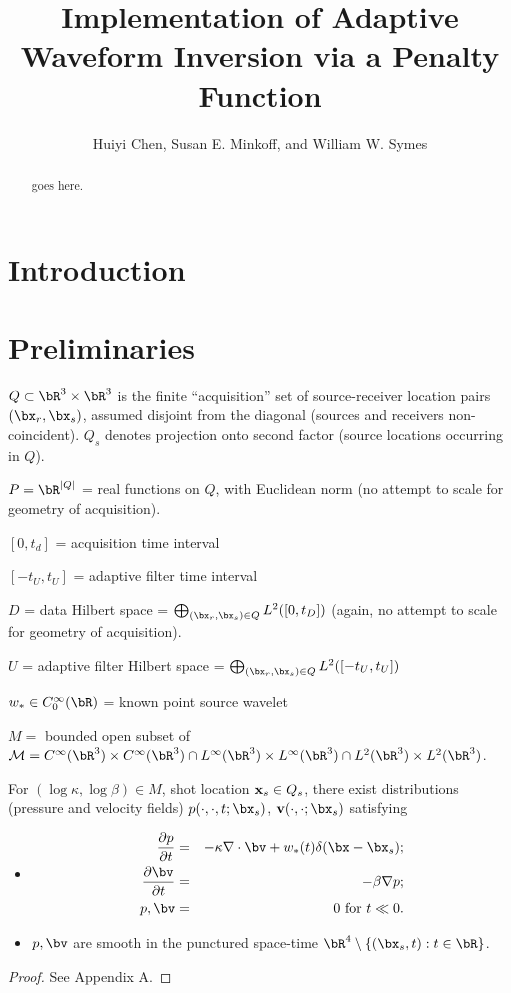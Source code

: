 \title{Implementation of Adaptive Waveform Inversion via a Penalty Function}
\author{Huiyi Chen, Susan E. Minkoff, and William W. Symes}

\begin{abstract}
goes here.
\end{abstract}

\section{Introduction}

\section{Preliminaries}


$Q \subset \bR^3 \times \bR^3$ is the finite ``acquisition'' set of source-receiver location pairs $(\bx_r,\bx_s)$, assumed disjoint from the diagonal (sources and receivers non-coincident). $Q_s$ denotes projection onto second factor (source locations occurring in $Q$).

$P = \bR^{|Q|}$ = real functions on $Q$, with Euclidean norm (no attempt to scale for geometry of acquisition).

$[0,t_d]$ = acquisition time interval

$[-t_U,t_U]$ = adaptive filter time interval

$D$ = data Hilbert space = $\bigoplus_{(\bx_r,\bx_s) \in Q} L^2([0,t_D])$ (again, no attempt to scale for geometry of acquisition).

$U$ = adaptive filter Hilbert space = $\bigoplus_{(\bx_r,\bx_s) \in Q} L^2([-t_U,t_U])$

$w_* \in C_0^{\infty}(\bR)$ = known point source wavelet

$M = $ bounded open subset of ${\cal M} = C^{\infty}(\bR^3) \times C^{\infty}(\bR^3) \cap L^{\infty}(\bR^3) \times L^{\infty}(\bR^3) \cap L^2(\bR^3) \times L^2(\bR^3)$.

\begin{theorem}
  \label{thm:eu}
For $(\log \kappa, \log \beta) \in M$, shot location ${\bf x}_s\in Q_s$, there exist distributions (pressure and velocity fields) $p(\cdot,\cdot,t;\bx_s)$, ${\bf v}(\cdot,\cdot;\bx_s)$ satisfying
\begin{itemize}
\item
  \begin{eqnarray}
    \label{eqn:awe}
    \frac{\partial p}{\partial t} & = & - \kappa \nabla \cdot \bv +
                                        w_*(t) \delta(\bx-\bx_s); \\
    \frac{\partial \bv}{\partial t} & = & - \beta \nabla p; \\
    p, \bv & = & 0 \mbox{ for }  t \ll 0.
  \end{eqnarray}
\item
  $p, \bv$ are smooth in the punctured space-time $\bR^4 \setminus \{(\bx_s,t): t \in \bR\}$.
\end{itemize}
\end{theorem}
\begin{proof}
  See Appendix A.
\end{proof}

